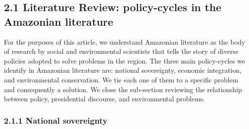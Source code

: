 \documentclass[
]{article}
\begin{document}
\hypertarget{literature-review-policy-cycles-in-the-amazonian-literature}{%
\subsection{2.1 Literature Review: policy-cycles in the Amazonian
literature}\label{literature-review-policy-cycles-in-the-amazonian-literature}}

For the purposes of this article, we understand Amazonian literature as
the body of research by social and environmental scientists that tells
the story of diverse policies adopted to solve problems in the region.
The three main policy-cycles we identify in Amazonian literature are:
national sovereignty, economic integration, and environmental
conservation. We tie each one of them to a specific problem and
consequently a solution. We close the sub-section reviewing the
relationship between policy, presidential discourse, and environmental
problems.

\hypertarget{national-sovereignty}{%
\subsubsection{2.1.1 National sovereignty}\label{national-sovereignty}}
\end{document}
